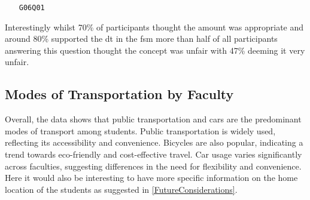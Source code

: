 \begin{enumerate}
    \item[\texttt{G06Q01}] 
\end{enumerate}

Interestingly whilst 70\% of participants thought the amount was appropriate and around 80\% supported the \acrshort{dt} in the \acrshort{fsm} more than half of all participants answering this question thought the concept was unfair with 47\% deeming it very unfair.

\pagebreak
\subsection{Modes of Transportation by Faculty}

Overall, the data shows that public transportation and cars are the predominant modes of transport among students. Public transportation is widely used, reflecting its accessibility and convenience. Bicycles are also popular, indicating a trend towards eco-friendly and cost-effective travel. Car usage varies significantly across faculties, suggesting differences in the need for flexibility and convenience. Here it would also be interesting to have more specific information on the home location of the students as suggested in \ref{FutureConsiderations}.
 


